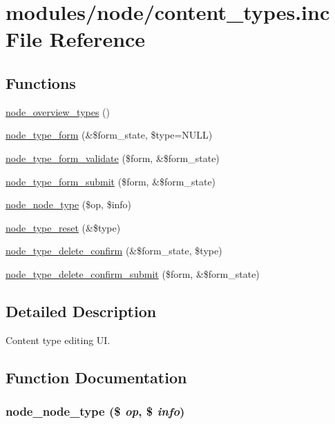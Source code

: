 \hypertarget{content__types_8inc}{
\section{modules/node/content\_\-types.inc File Reference}
\label{content__types_8inc}
}
\subsection*{Functions}
\begin{CompactItemize}
\item 
\hyperlink{content__types_8inc_9530bf9d596b557e8c77f196960dde84}{node\_\-overview\_\-types} ()
\item 
\hyperlink{content__types_8inc_29b6f02d1269c1f1f0e8d6d0e18f9b96}{node\_\-type\_\-form} (\&\$form\_\-state, \$type=NULL)
\item 
\hyperlink{content__types_8inc_9bce2bd1a17217d5573cdc8b4465c1f9}{node\_\-type\_\-form\_\-validate} (\$form, \&\$form\_\-state)
\item 
\hyperlink{content__types_8inc_fa55f7240b05f2a2804c11766228a5af}{node\_\-type\_\-form\_\-submit} (\$form, \&\$form\_\-state)
\item 
\hyperlink{content__types_8inc_466e4a937690f9ea448711dabbbe843f}{node\_\-node\_\-type} (\$op, \$info)
\item 
\hyperlink{content__types_8inc_cf80450120d7e77131b8a42c857bfb8a}{node\_\-type\_\-reset} (\&\$type)
\item 
\hyperlink{content__types_8inc_c6ec6d24eccef00581a060b9081a7e1d}{node\_\-type\_\-delete\_\-confirm} (\&\$form\_\-state, \$type)
\item 
\hyperlink{content__types_8inc_ef7aa2855944bc4869a9956736b2845a}{node\_\-type\_\-delete\_\-confirm\_\-submit} (\$form, \&\$form\_\-state)
\end{CompactItemize}


\subsection{Detailed Description}
Content type editing UI. 

\subsection{Function Documentation}
\hypertarget{content__types_8inc_466e4a937690f9ea448711dabbbe843f}{
\subsubsection[{node\_\-node\_\-type}]{\setlength{\rightskip}{0pt plus 5cm}node\_\-node\_\-type (\$ {\em op}, \/  \$ {\em info})}}
\label{content__types_8inc_466e4a937690f9ea448711dabbbe843f}


